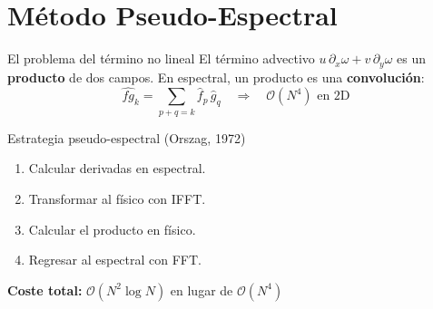\documentclass[aspectratio=169, 12pt]{beamer}
\begin{document}
\section{Método Pseudo-Espectral}

\begin{frame}{El problema del término no lineal}
  El término advectivo $u\,\partial_x\omega + v\,\partial_y\omega$
  es un \textbf{producto} de dos campos. En espectral, un producto
  es una \textbf{convolución}:
  \[
    \widehat{fg}_k = \sum_{p+q=k} \hat{f}_p\,\hat{g}_q
    \quad \Rightarrow \quad \mathcal{O}(N^4) \text{ en 2D}
  \]

  \vspace{0.3em}
  \begin{alertblock}{Estrategia pseudo-espectral (Orszag, 1972)}
    \begin{enumerate}
      \item Calcular derivadas en espectral.
      \item Transformar al físico con IFFT.
      \item Calcular el producto en físico.
      \item Regresar al espectral con FFT.
    \end{enumerate}
    \vspace{0.2em}
    \textbf{Coste total:} $\mathcal{O}(N^2\log N)$ en lugar de $\mathcal{O}(N^4)$
  \end{alertblock}
\end{frame}
\end{document}
